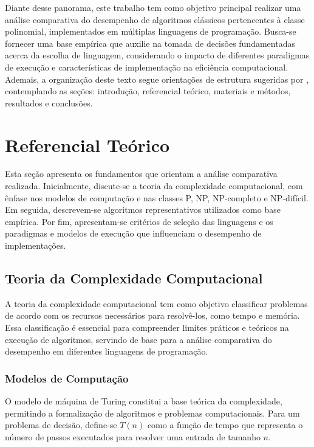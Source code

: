 \documentclass[12pt,a4paper]{article}
\begin{document}
Diante desse panorama, este trabalho tem como objetivo principal realizar uma análise comparativa do desempenho de algoritmos clássicos pertencentes à classe polinomial, implementados em múltiplas linguagens de programação. Busca-se fornecer uma base empírica que auxilie na tomada de decisões fundamentadas acerca da escolha de linguagem, considerando o impacto de diferentes paradigmas de execução e características de implementação na eficiência computacional. Ademais, a organização deste texto segue orientações de estrutura sugeridas por , contemplando as seções: introdução, referencial teórico, materiais e métodos, resultados e conclusões.




\section{Referencial Teórico}

Esta seção apresenta os fundamentos que orientam a análise comparativa realizada. Inicialmente, discute-se a teoria da complexidade computacional, com ênfase nos modelos de computação e nas classes P, NP, NP-completo e NP-difícil. Em seguida, descrevem-se algoritmos representativos utilizados como base empírica. Por fim, apresentam-se critérios de seleção das linguagens e os paradigmas e modelos de execução que influenciam o desempenho de implementações.

\subsection{Teoria da Complexidade Computacional}
A teoria da complexidade computacional tem como objetivo classificar problemas de acordo com os recursos necessários para resolvê-los, como tempo e memória. Essa classificação é essencial para compreender limites práticos e teóricos na execução de algoritmos, servindo de base para a análise comparativa do desempenho em diferentes linguagens de programação.

\subsubsection{Modelos de Computação}
O modelo de máquina de Turing constitui a base teórica da complexidade, permitindo a formalização de algoritmos e problemas computacionais. Para um problema de decisão, define-se \(T(n)\) como a função de tempo que representa o número de passos executados para resolver uma entrada de tamanho \(n\).
\end{document}
